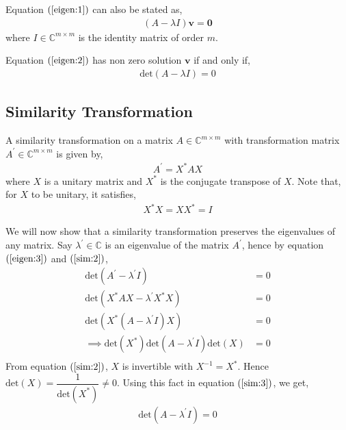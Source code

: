 \documentclass[12pt]{article}
\newcommand{\vecb}[1]{\mathbf{#1}}
\newcommand{\brak}[1]{\ensuremath{\left(#1\right)}}
\newcommand{\defmat}[2]{#1\in\mathbb{C}^{#2\times#2}}
\begin{document}
Equation \brak{\ref{eigen:1}} can also be stated as,
\begin{align}
\label{eigen:2}
   \brak{A - \lambda I} \vecb{v} = \vecb{0} 
\end{align}
where $I \in \mathbb{C}^{m \times m}$ is the identity matrix of order $m$.
\newline

Equation \brak{\ref{eigen:2}} has non zero solution $\vecb{v}$ if and only if, 
\begin{align}
\label{eigen:3}
    \text{det}\brak{A - \lambda I} = 0
\end{align}

\subsection{Similarity Transformation}
A similarity transformation on a matrix $\defmat{A}{m}$ with transformation matrix $\defmat{A^{\prime}}{m}$ is given by,
\begin{align}
    A^{\prime} = X^{\ast} A X
\end{align}
where $X$ is a unitary matrix and $X^{\ast}$ is the conjugate transpose of $X$.
Note that, for $X$ to be unitary, it satisfies,
\begin{align}
    \label{sim:2}
    X^{\ast}X = XX^{\ast} = I
\end{align}

We will now show that a similarity transformation preserves the eigenvalues of any matrix.
\newline
Say $\lambda^{\prime} \in \mathbb{C}$ is an eigenvalue of the matrix $A^{\prime}$, hence by equation \brak{\ref{eigen:3}} and \brak{\ref{sim:2}},
\begin{align}
    \text{det}\brak{A^{\prime} - \lambda^{\prime} I} &= 0\\
    \text{det}\brak{X^{\ast}AX - \lambda^{\prime} X^{\ast}X} &= 0\\
    \text{det}\brak{X^{\ast}\brak{A - \lambda^{\prime}I} X} &= 0\\
    \label{sim:3} \implies \text{det}\brak{X^{\ast}} \text{det}\brak{A - \lambda^{\prime}I} \text{det}\brak{X} &= 0\\
\end{align}
From equation \brak{\ref{sim:2}}, $X$ is invertible with $X^{-1} = X^{\ast}$. Hence $\text{det} \brak{X} = \dfrac{1}{\text{det} \brak{X^{\ast}}}\neq 0$.
\newline
Using this fact in equation \brak{\ref{sim:3}}, we get,
\begin{align}
    \text{det}\brak{A - \lambda^{\prime} I} = 0
\end{align}
\end{document}
